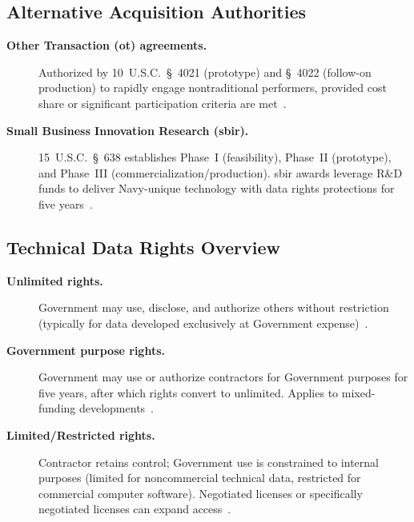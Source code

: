 \documentclass[../main.tex]{subfiles}
\begin{document}
\subsection{Alternative Acquisition Authorities}
\begin{description}
	\item[\textbf{Other Transaction (\ac{ot}) agreements.}] Authorized by 10~U.S.C.~\S~4021 (prototype) and \S~4022 (follow-on production) to rapidly engage nontraditional performers, provided cost share or significant participation criteria are met~\autocite{USC-4021-OTA,USC-4022-OTF}.
	\item[\textbf{Small Business Innovation Research (\ac{sbir}).}]15~U.S.C.~\S~638 establishes Phase~I (feasibility), Phase~II (prototype), and Phase~III (commercialization/production). \ac{sbir} awards leverage R\&D funds to deliver Navy-unique technology with data rights protections for five years~\autocite{USC-638-SBIR}.
\end{description}

\subsection{Technical Data Rights Overview}
\begin{description}
	\item[\textbf{Unlimited rights.}] Government may use, disclose, and authorize others without restriction (typically for data developed exclusively at Government expense)~\autocite{DFARS}.
	\item[\textbf{Government purpose rights.}] Government may use or authorize contractors for Government purposes for five years, after which rights convert to unlimited. Applies to mixed-funding developments~\autocite{DFARS}.
	\item[\textbf{Limited/Restricted rights.}] Contractor retains control; Government use is constrained to internal purposes (limited for noncommercial technical data, restricted for commercial computer software). Negotiated licenses or specifically negotiated licenses can expand access~\autocite{DFARS}.
\end{description}
\end{document}
